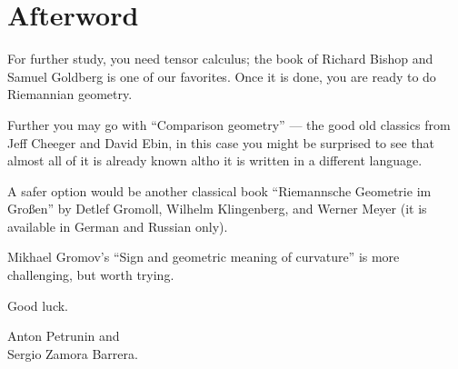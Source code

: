 \chapter*{Afterword}



For further study, you need tensor calculus; the book of Richard Bishop and Samuel Goldberg \cite{bishop-goldberg} is one of our favorites.
Once it is done, you are ready to do Riemannian geometry.

Further you may go with  ``Comparison geometry'' \cite{cheeger-ebin} --- the good old classics from Jeff Cheeger and David Ebin, in this case you might be surprised to see that almost all of it is already known altho it is written in a different language.

A safer option would be another classical book ``Riemannsche Geometrie im Großen'' \cite{gromoll-klingenberg-meyer} by 
Detlef Gromoll,
Wilhelm Klingenberg, 
and  Werner Meyer (it is available in German and Russian only).

Mikhael Gromov's ``Sign and geometric meaning of curvature'' \cite{gromov-1991} is more challenging, but worth trying.

Good luck.

\begin{flushright}
Anton Petrunin and\\
Sergio Zamora Barrera.
\end{flushright}
